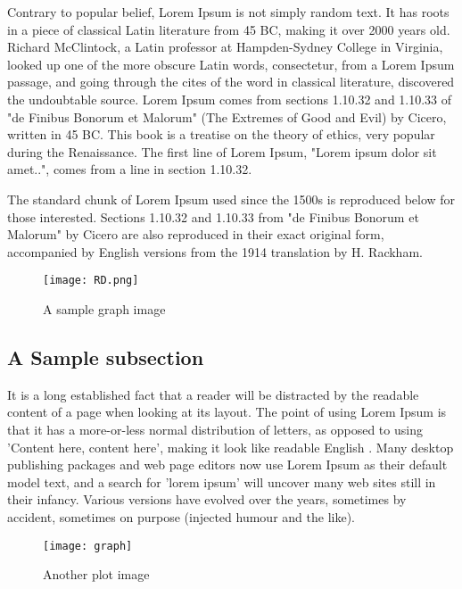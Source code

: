 \documentclass[11pt, fullpage]{article}
\begin{document}
Contrary to popular belief, Lorem Ipsum is not simply random text. It has roots in a piece of classical Latin literature from 45 BC, making it over 2000 years old. Richard McClintock, a Latin professor at Hampden-Sydney College in Virginia, looked up one of the more obscure Latin words, consectetur, from a Lorem Ipsum passage, and going through the cites of the word in classical literature, discovered the undoubtable source. Lorem Ipsum comes from sections 1.10.32 and 1.10.33 of "de Finibus Bonorum et Malorum" (The Extremes of Good and Evil) by Cicero, written in 45 BC. This book is a treatise on the theory of ethics, very popular during the Renaissance. The first line of Lorem Ipsum, "Lorem ipsum dolor sit amet..", comes from a line in section 1.10.32.

The standard chunk of Lorem Ipsum used since the 1500s is reproduced below for those interested. Sections 1.10.32 and 1.10.33 from "de Finibus Bonorum et Malorum" by Cicero are also reproduced in their exact original form, accompanied by English versions from the 1914 translation by H. Rackham.

\begin{figure}[ht]
\begin{center}
\texttt{[image: RD.png]}
\caption{A sample graph image}
\end{center}
\end{figure}

\subsection{A Sample subsection}
It is a long established fact that a reader will be distracted by the readable content of a page when looking at its layout. The point of using Lorem Ipsum is that it has a more-or-less normal distribution of letters, as opposed to using 'Content here, content here', making it look like readable English \cite{gass}. Many desktop publishing packages and web page editors now use Lorem Ipsum as their default model text, and a search for 'lorem ipsum' will uncover many web sites still in their infancy. Various versions have evolved over the years, sometimes by accident, sometimes on purpose (injected humour and the like).

\begin{figure}[ht]
\label{hourglass}
\begin{center}
\texttt{[image: graph]}
\caption{Another plot image}
\end{center}
\end{figure}
\end{document}
